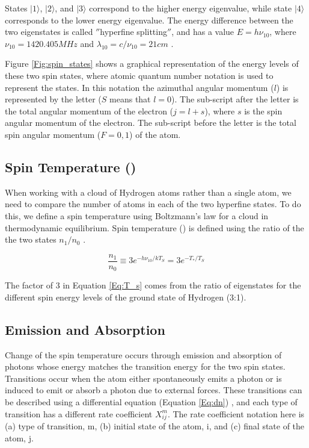 States $| 1 \rangle$, $| 2 \rangle$, and $| 3 \rangle$ correspond to the higher energy eigenvalue, while state $| 4 \rangle$ corresponds to the lower energy eigenvalue. The energy difference between the two eigenstates is called $''$hyperfine splitting$''$, and has a value $E = h \nu_{10}$, where $\nu_{10}=1420.405MHz$ and $\lambda_{10} = c /\nu_{10} = 21 cm$ \cite{townsend2000}. 

Figure \ref{Fig:spin_states} shows a graphical representation of the energy levels of these two spin states, where atomic quantum number notation is used to represent the states. In this notation the azimuthal angular momentum ($l$) is represented by the letter ($S$ means that $l=0$). The sub-script after the letter is the total angular momentum of the electron ($j=l+s$), where $s$ is the spin angular momentum of the electron. The sub-script before the letter is the total spin angular momentum ($F=0,1$) of the atom. 


\subsection{Spin Temperature (\ts)}

When working with a cloud of Hydrogen atoms rather than a single atom, we need to compare the number of atoms in each of the two hyperfine states. To do this, we define a spin temperature using Boltzmann's law for a cloud in thermodynamic equilibrium. Spin temperature (\ts) is defined using the ratio of the the two states $n_1/n_0$ \cite{field_1958}. 

\begin{equation}\label{Eq:T_s}
\frac{n_1}{n_0} \equiv 3 e^{- h \nu_{10} / kT_S} = 3 e^{-T_*/T_S}
\end{equation} 

The factor of 3 in Equation \ref{Eq:T_s} comes from the ratio of eigenstates for the different spin energy levels of the ground state of Hydrogen (3:1). 


\subsection{Emission and Absorption} \label{Sec:dT_S}

Change of the spin temperature occurs through emission and absorption of photons whose energy matches the transition energy for the two spin states. Transitions occur when the atom either spontaneously emits a photon or is induced to emit or absorb a photon due to external forces. These transitions can be described using a differential equation (Equation \ref{Eq:dn}) \cite{furlanetto_2006}, and each type of transition has a different rate coefficient $X^m_{ij}$. The rate coefficient notation here is (a) type of transition, m, (b) initial state of the atom, i, and (c) final state of the atom, j. 

